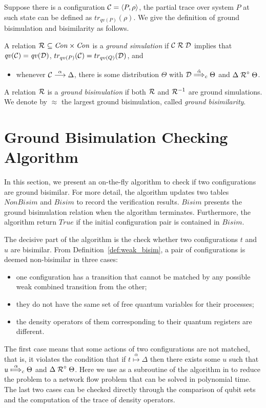 \documentclass[runningheads]{llncs}
\newcommand{\lift}[1]{\mathrel{{#1}^\circ}}
\newcommand{\Con}{{\it Con}}
\newcommand{\qv}{{\it qv}}
\newcommand{\CC}{{\cal C}}
\newcommand{\CD}{{\cal D}}
\begin{document}
Suppose there is a configuration $\CC=\langle P,\rho\rangle$, the partial trace over system $P$ at such state can be defined as $tr_{qv(P)}(\rho)$. We give the definition of ground bisimulation and bisimilarity as follows. 
\begin{definition}[\cite{DF12}]\label{def:weak_bisim}
	A relation $\aRel\ \subseteq \Con\times\Con$ is a \emph{ground simulation} if
	$\CC\aRel \CD$ implies that $\qv(\CC)=\qv(\CD)$, $tr_{qv(P)}(\CC)=tr_{qv(Q)}(\CD)$,
	and
	\begin{itemize}
		\item whenever $\CC\ar{\alpha} \Delta$, there is some distribution $\Theta$ with $\CD\dar{\hat{\alpha}}_{c}\Theta$ and $\Delta \lift{\aRel} \Theta$.
	\end{itemize}
	A relation $\mathrel{{\mathcal R }}$ is a \emph{ground bisimulation} if both $\mathrel{{\mathcal R }}$ and
	$\mathrel{{\mathcal R }}^{-1}$ are ground simulations. %
	We denote by $\approx$ the largest ground bisimulation, called \emph{ground bisimilarity}.
\end{definition}

\section{Ground Bisimulation Checking Algorithm}\label{sec:algorithm}

In this section, we present an on-the-fly algorithm to check if two configurations are ground bisimilar. For more detail, the algorithm updates two tables $NonBisim$ and $Bisim$ to record the verification results. $Bisim$ presents the ground bisimulation relation when the algorithm terminates. Furthermore, the algorithm return $True$ if the initial configuration pair is contained in $Bisim$.

The decisive part of the algorithm is the check whether two configurations $t$ and $u$ are bisimilar. From  Definition~\ref{def:weak_bisim}, a pair of configurations is deemed non-bisimilar in three cases:
\vspace{-0.25em}
\begin{itemize}
    \item one configuration has a transition that cannot be matched by any possible weak combined transition from the other;
    \item they do not have the same set of free quantum variables for their processes;
    \item the density operators of them corresponding to their quantum registers are different.
\end{itemize}
\vspace{-0.25em}
The first case means that some actions of two configurations are not matched, that is, it violates the condition that if $t\overset{\alpha}{\longmapsto}\Delta$ then there exists some $u$ such that $u\overset{\alpha}{\mapstochar\Longrightarrow}_{c}\Theta$ and $\Delta \lift{\aRel} \Theta$. Here we use as a subroutine of the algorithm in \cite{TH15} to reduce the problem to a network flow problem that can be solved in polynomial time. The last two cases can be checked directly through the comparison of qubit sets and the computation of the trace of density operators.
\end{document}
